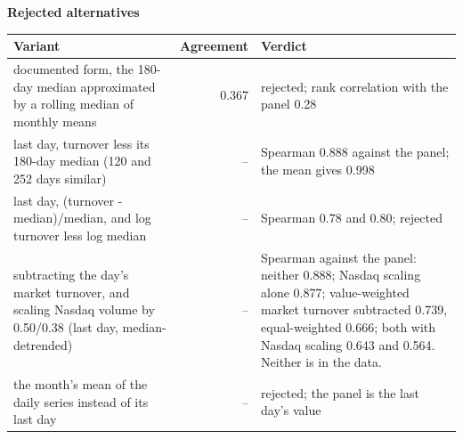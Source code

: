 \documentclass[11pt]{article}
\begin{document}
\textbf{Rejected alternatives}\\[2pt]
{\small\begin{longtable}{@{}p{9.6cm}rp{4.3cm}@{}}
\toprule Variant & Agreement & Verdict\\\midrule\endhead
documented form, the 180-day median approximated by a rolling median of monthly means & 0.367 & rejected; rank correlation with the panel 0.28\\
last day, turnover less its 180-day median (120 and 252 days similar) & -- & Spearman 0.888 against the panel; the mean gives 0.998\\
last day, (turnover - median)/median, and log turnover less log median & -- & Spearman 0.78 and 0.80; rejected\\
subtracting the day's market turnover, and scaling Nasdaq volume by 0.50/0.38 (last day, median-detrended) & -- & Spearman against the panel: neither 0.888; Nasdaq scaling alone 0.877; value-weighted market turnover subtracted 0.739, equal-weighted 0.666; both with Nasdaq scaling 0.643 and 0.564. Neither is in the data.\\
the month's mean of the daily series instead of its last day & -- & rejected; the panel is the last day's value\\
\bottomrule\end{longtable}}
\end{document}
